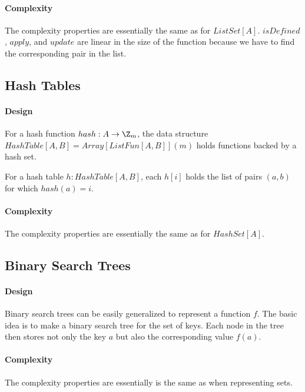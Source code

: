 \paragraph{Complexity}
The complexity properties are essentially the same as for $ListSet[A]$.
$isDefined$, $apply$, and $update$ are linear in the size of the function because we have to find the corresponding pair in the list.

\subsection{Hash Tables}

\paragraph{Design}
For a hash function $hash:A\to \Z_m$, the data structure $HashTable[A,B]=Array[ListFun[A,B]](m)$ holds functions backed by a hash set.

For a hash table $h:HashTable[A,B]$, each $h[i]$ holds the list of pairs $(a,b)$ for which $hash(a)=i$.

\paragraph{Complexity}
The complexity properties are essentially the same as for $HashSet[A]$.

\subsection{Binary Search Trees}

\paragraph{Design}
Binary search trees can be easily generalized to represent a function $f$.
The basic idea is to make a binary search tree for the set of keys.
Each node in the tree then stores not only the key $a$ but also the corresponding value $f(a)$.

\paragraph{Complexity}
The complexity properties are essentially is the same as when representing sets.

